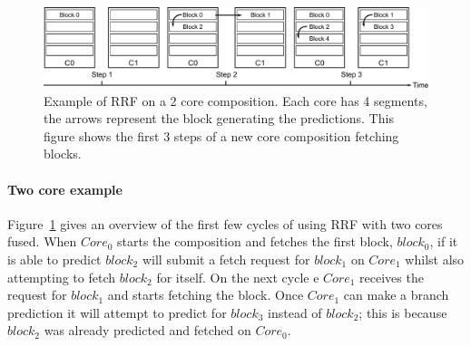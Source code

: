 \begin{figure}[t]
    \centering
    \includegraphics[width=1\textwidth]{chapter3/graphics/fetching-model.pdf}
\vspace{-1em}

    \caption{Example of RRF on a 2 core composition. Each core has 4 segments, the arrows represent the block generating the predictions. This figure shows the first 3 steps of a new core composition fetching blocks.}
    \label{fig:new_fetch_ex}
	
	\end{figure}
\paragraph*{Two core example}
	
Figure~\ref{fig:new_fetch_ex} gives an overview of the first few cycles of using RRF with two cores fused.
When $Core_0$ starts the composition and fetches the first block, $block_0$, if it is able to predict $block_2$ will submit a fetch request for $block_1$ on $Core_1$ whilst also attempting to fetch $block_2$ for itself.
On the next cycle	e $Core_1$ receives the request for $block_1$ and starts fetching the block.
Once $Core_1$ can make a branch prediction it will attempt to predict for $block_3$ instead of $block_2$; this is because $block_2$ was already predicted and fetched on $Core_0$.



